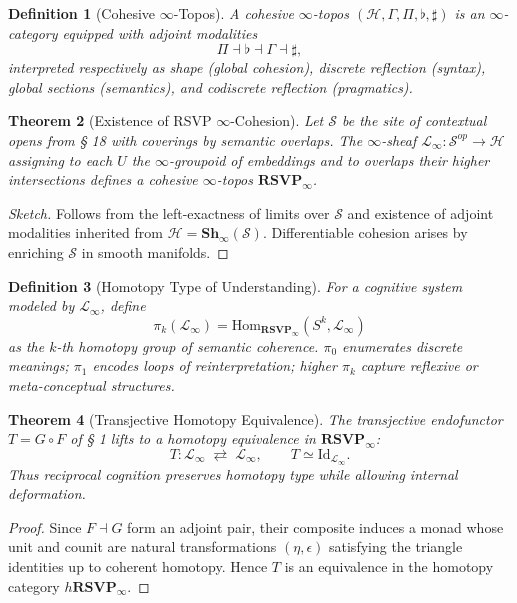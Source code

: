 \documentclass[12pt,a4paper,twoside,openright]{book}
\newtheorem{theorem}{Theorem}
\newtheorem{definition}[theorem]{Definition}
\begin{document}
\begin{definition}[Cohesive \texorpdfstring{$\infty$}{∞}-Topos]
A \emph{cohesive $\infty$-topos} $(\mathcal{H},\Gamma,\Pi,\flat,\sharp)$
is an $\infty$-category equipped with adjoint modalities
\[
\Pi\dashv\flat\dashv\Gamma\dashv\sharp,
\]
interpreted respectively as shape (global cohesion), discrete reflection (syntax), global sections (semantics), and codiscrete reflection (pragmatics).
\end{definition}

\begin{theorem}[Existence of RSVP $\infty$-Cohesion]
\label{thm:rsvpcohesion}
Let $\mathcal{S}$ be the site of contextual opens from § 18 with coverings by semantic overlaps.  
The $\infty$-sheaf $\mathcal{L}_\infty\colon \mathcal{S}^{op}\to\mathcal{H}$
assigning to each $U$ the $\infty$-groupoid of embeddings and to overlaps their higher intersections defines a cohesive $\infty$-topos $\mathbf{RSVP}_\infty$.  
\end{theorem}

\begin{proof}[Sketch]
Follows from the left-exactness of limits over $\mathcal{S}$ and existence of adjoint modalities inherited from $\mathcal{H}=\mathbf{Sh}_\infty(\mathcal{S})$.  
Differentiable cohesion arises by enriching $\mathcal{S}$ in smooth manifolds.
\end{proof}

\begin{definition}[Homotopy Type of Understanding]
For a cognitive system modeled by $\mathcal{L}_\infty$, define
\[
\pi_k(\mathcal{L}_\infty)
 = \mathrm{Hom}_{\mathbf{RSVP}_\infty}(S^k,\mathcal{L}_\infty)
\]
as the $k$-th homotopy group of semantic coherence.  
$\pi_0$ enumerates discrete meanings; $\pi_1$ encodes loops of reinterpretation; higher $\pi_k$ capture reflexive or meta-conceptual structures.
\end{definition}

\begin{theorem}[Transjective Homotopy Equivalence]
\label{thm:transjhom}
The transjective endofunctor $T=G\circ F$ of § 1 lifts to a homotopy equivalence in $\mathbf{RSVP}_\infty$:
\[
T\colon \mathcal{L}_\infty \;\rightleftarrows\; \mathcal{L}_\infty,\qquad
T\simeq \mathrm{Id}_{\mathcal{L}_\infty}.
\]
Thus reciprocal cognition preserves homotopy type while allowing internal deformation.
\end{theorem}

\begin{proof}
Since $F\dashv G$ form an adjoint pair, their composite induces a monad whose unit and counit are natural transformations $(\eta,\epsilon)$ satisfying the triangle identities up to coherent homotopy.  
Hence $T$ is an equivalence in the homotopy category $h\mathbf{RSVP}_\infty$.
\end{proof}
\end{document}
